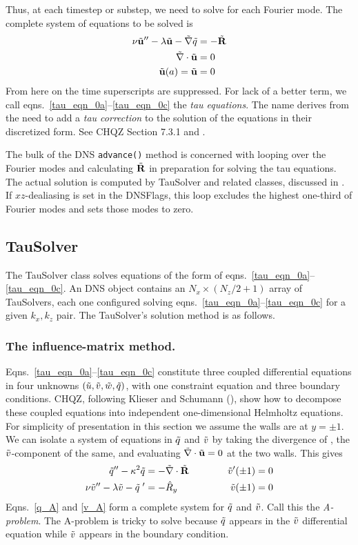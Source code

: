 \documentclass{article}[12pt]
\begin{document}
Thus, at each timestep or substep, we need to solve  for
each Fourier mode. The complete system of equations to be solved is
\begin{align}
\nu \tilde{{\bf u}}'' - \lambda \tilde{{\bf u}} - \tilde{\bf \nabla} \tilde{q} & = -\tilde{{\bf R}} \label{tau_eqn_0a}\\
\tilde{\bf \nabla} \cdot \tilde{{\bf u}} &= 0 \label{tau_eqn_0b} \\
\tilde{{\bf u}}(a) = \tilde{{\bf u}} &= 0 \label{tau_eqn_0c}
\end{align}
From here on the time superscripts are suppressed. For lack of a better
term, we call eqns.\ \ref{tau_eqn_0a}--\ref{tau_eqn_0c} the
{\em tau equations}. The name derives from the need to add a
{\em tau correction} to the solution of the equations in their
discretized form. See CHQZ Section 7.3.1 and .

The bulk of the DNS {\tt advance()} method is concerned with looping
over the Fourier modes and calculating $\tilde{{\bf R}}$ in preparation for
solving the tau equations. The actual solution is computed by
TauSolver and related classes, discussed in . If
$xz$-dealiasing is set in the DNSFlags, this loop excludes the highest
one-third of Fourier modes and sets those modes to zero.

\subsection{TauSolver}
\label{sec:tausolver}

The TauSolver class solves equations of the form of
eqns.\ \ref{tau_eqn_0a}--\ref{tau_eqn_0c}. An DNS object
contains an $N_x \times (N_z/2+1)$ array of TauSolvers, each one
configured solving eqns.\ \ref{tau_eqn_0a}--\ref{tau_eqn_0c} for
a given $k_x,k_z$ pair. The TauSolver's solution method is as follows.

\subsubsection{The influence-matrix method.}
\label{sec:influence_matrix}

Eqns.\ \ref{tau_eqn_0a}--\ref{tau_eqn_0c} constitute three coupled
differential equations in four unknowns $(\tilde{u},\tilde{v},\tilde{w},\tilde{q})$, with
one constraint equation and three boundary conditions. CHQZ, following
Klieser and Schumann (\cite{Kleiser80}), show how to decompose these
coupled equations into independent one-dimensional Helmholtz
equations. For simplicity of presentation in this section we assume
the walls are at $y=\pm1$. We can isolate a system of equations in
$\tilde{q}$ and $\tilde{v}$ by taking the divergence of
, the $\tilde{v}$-component of the same, and evaluating
$\tilde{\bf \nabla} \cdot \tilde{{\bf u}} = 0$ at the two walls. This gives
\begin{alignat}{2}
\tilde{q}'' - \kappa^2 \tilde{q} &= - \tilde{\bf \nabla} \cdot \tilde{{\bf R}} \qquad \quad & \tilde{v}'(\pm 1) &= 0 \label{q_A} \\
\nu \tilde{v}'' - \lambda \tilde{v} - \tilde{q}\;' &= -\hat{R}_y & \tilde{v}(\pm 1) &= 0 \label{v_A}
\end{alignat}
Eqns.\ \ref{q_A} and \ref{v_A} form a complete system for $\tilde{q}$ and
$\tilde{v}$. Call this the {\em A-problem}. The A-problem is tricky to
solve because $\tilde{q}$ appears in the $\tilde{v}$ differential equation while
$\tilde{v}$ appears in the boundary condition.
\end{document}
